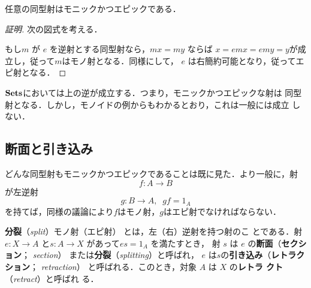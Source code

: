\begin{prop}
 任意の同型射はモニックかつエピックである．
\end{prop}
\begin{proof}[証明]
 次の図式を考える．
 \begin{center}
 \end{center}

 もし$m$ が $e$ を逆射とする同型射なら，$mx = my$ ならば
 $x = emx = emy = y$が成立し，従って$m$はモノ射となる．同様にして， $e$
 は右簡約可能となり，従ってエピ射となる．
\end{proof}
$\mathbf{Sets}$においては上の逆が成立する．つまり，モニックかつエピックな射は
同型射となる．しかし，モノイドの例からもわかるとおり，これは一般には成立
しない．

\subsection{断面と引き込み}
どんな同型射もモニックかつエピックであることは既に見た．より一般に，射
\[
 f: A \to B
\]
が左逆射
\[
 g: B \to A,\;\;gf = 1_A
\]
を持てば，同様の議論により$f$はモノ射，$g$はエピ射でなければならない．

\begin{definition}
 {\bfseries 分裂}（{\itshape split}）モノ射（エピ射）
 とは，左（右）逆射を持つ射のこ
 とである．射$e:X \to A$ と$s: A \to X$ があって$es = 1_A$ を満たすとき，
 射 $s$ は $e$ の{\bfseries 断面}（{\bfseries セクション}；{\itshape
 section}）%
 または{\bfseries 分裂}（{\itshape splitting}）と呼ばれ，
 $e$ は$s$の{\bfseries 引き込み}（{\bfseries レトラクション}；{\itshape
 retraction}） %
 と呼ばれる．このとき，対象 $A$ は $X$ の{\bfseries レトラ
 クト}（{\itshape retract}）と呼ばれ
 る．
\end{definition}

